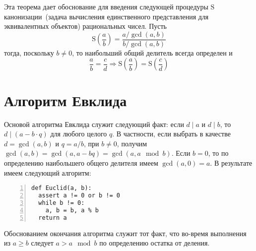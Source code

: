 \documentclass[14pt]{extreport}
\begin{document}
Эта теорема дает обоснование для введения следующей процедуры $\mathrm{S}$
канонизации~(задача вычисления единственного представ\-ле\-ния для эквивалентных
 объектов) рациональных чисел. Пусть
$$\mathrm{S}\left(\frac{a}{b}\right) = \frac{a/\gcd(a,b)}{b/\gcd(a,b)}$$
тогда, поскольку  $b \neq 0$, то наибольший общий делитель
всегда определен и
$$\frac{a}{b}=
\frac{c}{d} \Rightarrow \mathrm{S}\left(\frac{a}{b}\right)=
\mathrm{S}\left(\frac{c}{d}\right)$$

\section{Алгоритм Евклида}

Основой алгоритма Евклида служит
следующий факт: если $d \mid a$ и $d \mid b$, то $d \mid (a - b \cdot q)$ для
любого целого $q$. В частности, если выбрать в качестве
$d = \gcd(a, b)$ и  $q = a/b$, при $b \neq 0$, получим
$\gcd(a, b) = \gcd(a, a-bq) = \gcd(a, a \mod b)$. Если $b = 0$,
то по определению наибольшего общего делителя имеем
$\gcd(a, 0) = a$. В результате имеем следующий алгоритм:

\begin{Verbatim}[fontsize=\small,numbers=left,firstnumber=last,xleftmargin=7mm]
def Euclid(a, b):
  assert a != 0 or b != 0
  while b != 0:
    a, b = b, a % b
  return a
\end{Verbatim}
Обоснованием окончания алгоритма служит тот факт, что во-время выполнения
из $a \geq b$ следует $a > a \mod b$ по определению остатка от деления.
\end{document}
